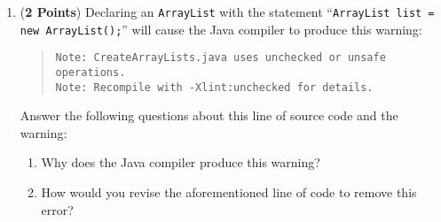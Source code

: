 \documentclass[12pt]{article}
\begin{document}
\begin{enumerate}
\begin{enumerate}
  \item ({\bf 2 Points}) Declaring an {\tt ArrayList} with the statement ``{\tt ArrayList list = new
      ArrayList();}'' will cause the Java compiler to produce this warning:
    
    \begin{quote}
      \begin{verbatim}
Note: CreateArrayLists.java uses unchecked or unsafe operations.
Note: Recompile with -Xlint:unchecked for details.
      \end{verbatim}
    \end{quote}

  \vspace*{-.25in}
  Answer the following questions about this line of source code and the warning:

  \begin{enumerate}

    \item Why does the Java compiler produce this warning?
      
    \item How would you revise the aforementioned line of code to remove this error?

  \end{enumerate}

  \end{enumerate}

 

    \end{enumerate}

  
\end{document}
